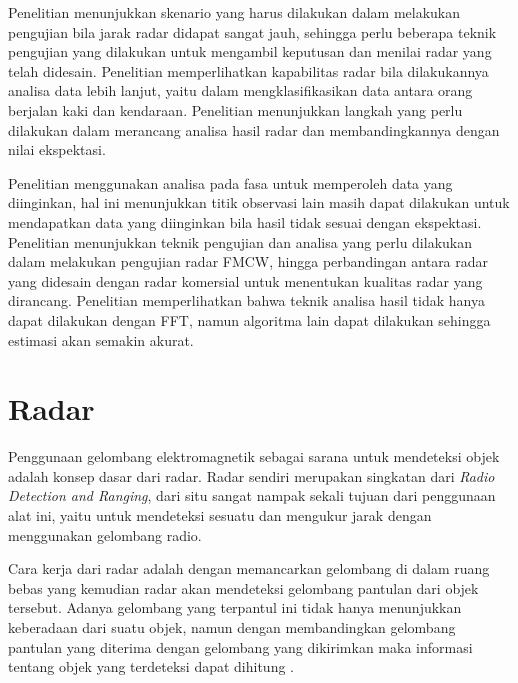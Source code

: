 Penelitian \cite{Dabrowski2020} menunjukkan skenario yang harus dilakukan dalam melakukan pengujian bila jarak radar didapat sangat jauh, sehingga perlu beberapa teknik pengujian yang dilakukan untuk mengambil keputusan dan menilai radar yang telah didesain. Penelitian \cite{Rizik2020} memperlihatkan kapabilitas radar bila dilakukannya analisa data lebih lanjut, yaitu dalam mengklasifikasikan data antara orang berjalan kaki dan kendaraan. Penelitian \cite{Jeong2021} menunjukkan langkah yang perlu dilakukan dalam merancang analisa hasil radar dan membandingkannya dengan nilai ekspektasi.

Penelitian \cite{Pramudita2020} menggunakan analisa pada fasa untuk memperoleh data yang diinginkan, hal ini menunjukkan titik observasi lain masih dapat dilakukan untuk mendapatkan data yang diinginkan bila hasil tidak sesuai dengan ekspektasi. Penelitian \cite{Pramudita2023} menunjukkan teknik pengujian dan analisa yang perlu dilakukan dalam melakukan pengujian radar FMCW, hingga perbandingan antara radar yang didesain dengan radar komersial untuk menentukan kualitas radar yang dirancang. Penelitian \cite{Zhou2023} memperlihatkan bahwa teknik analisa hasil tidak hanya dapat dilakukan dengan FFT, namun algoritma lain dapat dilakukan sehingga estimasi akan semakin akurat.


\section{Radar}

Penggunaan gelombang elektromagnetik sebagai sarana untuk mendeteksi objek adalah konsep dasar dari radar. Radar sendiri merupakan singkatan dari \textit{Radio Detection and Ranging}, dari situ sangat nampak sekali tujuan dari penggunaan alat ini, yaitu untuk mendeteksi sesuatu dan mengukur jarak dengan menggunakan gelombang radio. 

Cara kerja dari radar adalah dengan memancarkan gelombang di dalam ruang bebas yang kemudian radar akan mendeteksi gelombang pantulan dari objek tersebut. Adanya gelombang yang terpantul ini tidak hanya menunjukkan keberadaan dari suatu objek, namun dengan membandingkan gelombang pantulan yang diterima dengan gelombang yang dikirimkan maka informasi tentang objek yang terdeteksi dapat dihitung \cite{Skolnik2001}. 

